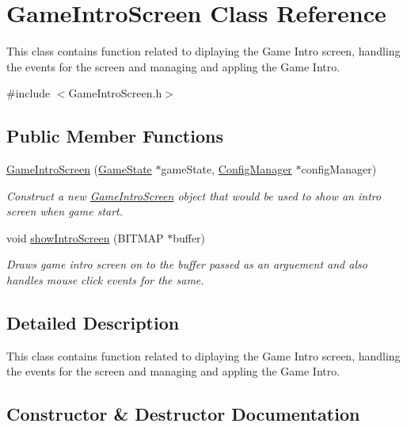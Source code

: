 \hypertarget{class_game_intro_screen}{}\section{Game\+Intro\+Screen Class Reference}
\label{class_game_intro_screen}


This class contains function related to diplaying the Game Intro screen, handling the events for the screen and managing and appling the Game Intro.  




{\ttfamily \#include $<$Game\+Intro\+Screen.\+h$>$}

\subsection*{Public Member Functions}
\begin{DoxyCompactItemize}
\item 
\mbox{\hyperlink{class_game_intro_screen_aa2093cbccab8074dee711e780482e9e2}{Game\+Intro\+Screen}} (\mbox{\hyperlink{struct_game_state}{Game\+State}} $\ast$game\+State, \mbox{\hyperlink{class_config_manager}{Config\+Manager}} $\ast$config\+Manager)
\begin{DoxyCompactList}\small\item\em Construct a new \mbox{\hyperlink{class_game_intro_screen}{Game\+Intro\+Screen}} object that would be used to show an intro screen when game start. \end{DoxyCompactList}\item 
void \mbox{\hyperlink{class_game_intro_screen_a86a225012009cea900efe9010e7520f5}{show\+Intro\+Screen}} (B\+I\+T\+M\+AP $\ast$buffer)
\begin{DoxyCompactList}\small\item\em Draws game intro screen on to the buffer passed as an arguement and also handles mouse click events for the same. \end{DoxyCompactList}\end{DoxyCompactItemize}


\subsection{Detailed Description}
This class contains function related to diplaying the Game Intro screen, handling the events for the screen and managing and appling the Game Intro. 



\subsection{Constructor \& Destructor Documentation}
\mbox{\label{class_game_intro_screen_aa2093cbccab8074dee711e780482e9e2}} 
